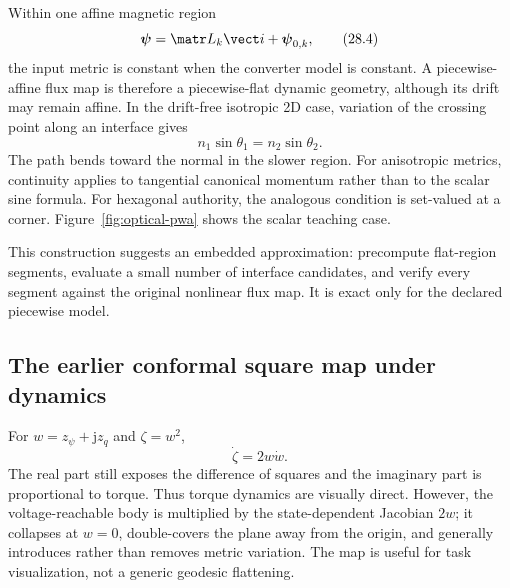 Within one affine magnetic region
\[
 \boldsymbol\psi=\matr L_k\vect i+\boldsymbol\psi_{0,k},
 \tag{28.4}
\]
the input metric is constant when the converter model is constant.  A
piecewise-affine flux map is therefore a piecewise-flat dynamic geometry,
although its drift may remain affine.  In the drift-free isotropic 2D case,
variation of the crossing point along an interface gives
\[
 \boxed{n_1\sin\theta_1=n_2\sin\theta_2.}
 \tag{28.5}
\]
The path bends toward the normal in the slower region.  For anisotropic
metrics, continuity applies to tangential canonical momentum rather than to
the scalar sine formula.  For hexagonal authority, the analogous condition is
set-valued at a corner.  Figure~\ref{fig:optical-pwa} shows the scalar teaching
case.



This construction suggests an embedded approximation: precompute flat-region
segments, evaluate a small number of interface candidates, and verify every
segment against the original nonlinear flux map.  It is exact only for the
declared piecewise model.

\subsection{The earlier conformal square map under dynamics}

For \(w=z_\psi+\mathrm jz_q\) and \(\zeta=w^2\),
\[
 \dot\zeta=2w\dot w.
 \tag{28.6}
\]
The real part still exposes the difference of squares and the imaginary part
is proportional to torque.  Thus torque dynamics are visually direct.
However, the voltage-reachable body is multiplied by the state-dependent
Jacobian \(2w\); it collapses at \(w=0\), double-covers the plane away from the
origin, and generally introduces rather than removes metric variation.  The
map is useful for task visualization, not a generic geodesic flattening.

